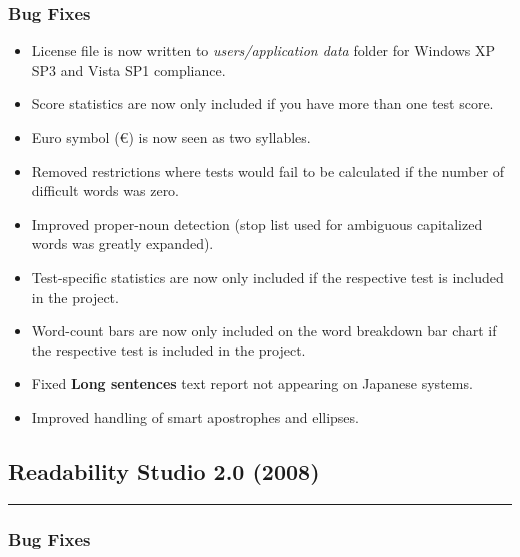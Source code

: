 \documentclass[
]{book}
\providecommand{\tightlist}{%
  \setlength{\itemsep}{0pt}\setlength{\parskip}{0pt}}
\theoremstyle{definition}
\theoremstyle{definition}
\theoremstyle{definition}
\theoremstyle{definition}
\theoremstyle{remark}
\begin{document}
\hypertarget{bug-fixes-3}{%
\subsubsection*{Bug Fixes}\label{bug-fixes-3}}

\begin{itemize}
\tightlist
\item
  License file is now written to \emph{users/application data} folder for Windows XP SP3 and Vista SP1 compliance.
\item
  Score statistics are now only included if you have more than one test score.
\item
  Euro symbol (€) is now seen as two syllables.
\item
  Removed restrictions where tests would fail to be calculated if the number of difficult words was zero.
\item
  Improved proper-noun detection (stop list used for ambiguous capitalized words was greatly expanded).
\item
  Test-specific statistics are now only included if the respective test is included in the project.
\item
  Word-count bars are now only included on the word breakdown bar chart if the respective test is included in the project.
\item
  Fixed \textbf{Long sentences} text report not appearing on Japanese systems.
\item
  Improved handling of smart apostrophes and ellipses.
\end{itemize}

\hypertarget{readability-studio-2.0-2008}{%
\subsection*{Readability Studio 2.0 (2008)}\label{readability-studio-2.0-2008}}

\begin{center}\rule{0.5\linewidth}{0.5pt}\end{center}

\hypertarget{bug-fixes-4}{%
\subsubsection*{Bug Fixes}\label{bug-fixes-4}}
\end{document}
